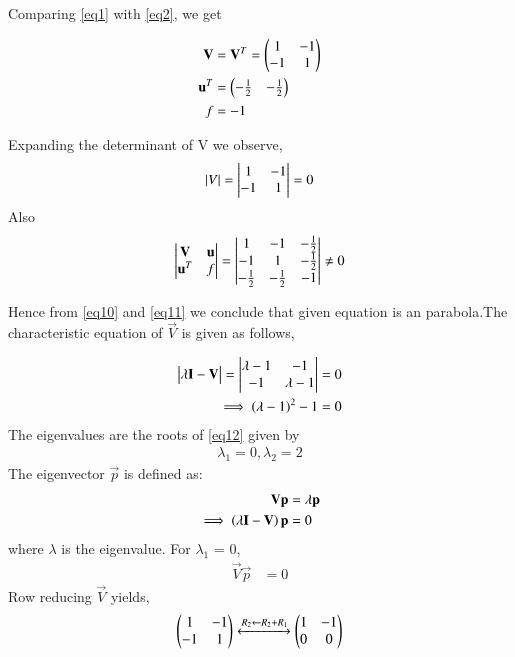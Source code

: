\documentclass[journal,12pt,twocolumn]{IEEEtran}
\begin{document}
Comparing \eqref{eq1} with \eqref{eq2}, we get

\begin{align}
\mathbf{V} &= \mathbf{V}^T = \begin{pmatrix} 1 &  -1 \\ -1 & 1 \end{pmatrix}
\\
\mathbf{u}^T &= \begin{pmatrix}-\frac{1}{2} & - \frac{1}{2}\end{pmatrix}
\\
f &= -1
\end{align}


Expanding the determinant of V we observe,
\begin{align}
\left\vert V\right\vert = \begin{vmatrix}1 & -1 \\ -1 & 1\end{vmatrix} = 0 \label{eq10}
\end{align}
Also
\begin{align}
\begin{vmatrix}\mathbf{V} & \mathbf{u} \\ \mathbf{u}^T & f\end{vmatrix} = 
\begin{vmatrix}
1 & -1 & -\frac{1}{2} \\ 
-1 & 1 & -\frac{1}{2} \\ 	
-\frac{1}{2} & -\frac{1}{2} & -1\end{vmatrix}
\neq 0
\label{eq11}
\end{align}

Hence from \eqref{eq10} and \eqref{eq11} we conclude
that given equation is an parabola.The characteristic equation of $\vec{V}$ is given as
follows,


\begin{align}
\begin{vmatrix}\lambda \mathbf{I}-\mathbf{V}\end{vmatrix} = \begin{vmatrix}\lambda -1 & -1 \\ -1 & \lambda - 1\end{vmatrix} &= 0
\\
\implies \left(\lambda - 1 \right)^2 -1 &= 0
\label{eq12}
\end{align}
The eigenvalues are the roots of \eqref{eq12} given by
\begin{align}
\lambda_1 = 0, \lambda_2 = 2
\label{eq13}
\end{align}
The eigenvector $\vec{p}$ is defined as:
\begin{align}
\mathbf{V} \mathbf{p}&= \lambda \mathbf{p}
\\
\implies \left(\lambda\mathbf{I}-\mathbf{V}\right)\mathbf{p} &=0
\end{align}
where $\lambda$ is the eigenvalue.  For $\lambda_1$ = 0,
\begin{align}
\vec{V} \vec{p}&=0
\end{align}
Row reducing $\vec{V}$ yields,
\begin{align}
 \begin{pmatrix} 1 & -1 \\ -1 & 1\end{pmatrix} 
\xleftrightarrow{R_2\leftarrow R_2+R_1} 
\begin{pmatrix}
	1 &  -1 \\ 0 & 0 
\end{pmatrix} 
\label{eq18}
\end{align}
\end{document}
